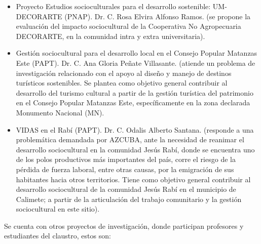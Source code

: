 \begin{itemize}
	\setlength\itemsep{-0.5em}
	\item Proyecto Estudios socioculturales para el desarrollo sostenible: UM-DECORARTE (PNAP). Dr. C. Rosa Elvira Alfonso Ramos. (se propone la evaluación del impacto sociocultural de la Cooperativa No Agropecuaria DECORARTE, en la comunidad intra y extra universitaria).
	\item Gestión sociocultural para el desarrollo local en el Consejo Popular Matanzas Este (PAPT). Dr. C. Ana Gloria Peñate Villasante. (atiende un problema de investigación relacionado con el apoyo al diseño y manejo de destinos turísticos sostenibles. Se plantea como objetivo general contribuir al desarrollo del turismo cultural a partir de la gestión turística del patrimonio en el Consejo Popular Matanzas Este, específicamente en la zona declarada Monumento Nacional (MN).
	\item VIDAS en el Rabí (PAPT). Dr. C. Odalis Alberto Santana. (responde a una problemática demandada por AZCUBA, ante la necesidad de reanimar el desarrollo sociocultural en la comunidad Jesús Rabí, donde se encuentra uno de los polos productivos más importantes del país, corre el riesgo de la pérdida de fuerza laboral, entre otras causas, por la emigración de sus habitantes hacia otros territorios. Tiene como objetivo general contribuir al desarrollo sociocultural de la comunidad Jesús Rabí en el municipio de Calimete; a partir de la articulación del trabajo comunitario y la gestión sociocultural en este sitio).
	
\end{itemize}

Se cuenta con otros proyectos de investigación, donde participan profesores y estudiantes del claustro, estos son:

